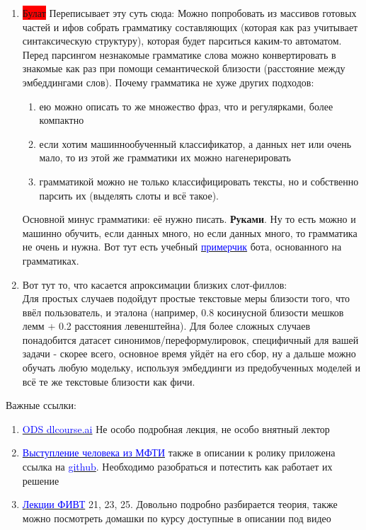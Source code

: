 \documentclass[11pt]{article}
\begin{document}
\begin{enumerate}
\item \colorbox{red}{Булат} Переписывает эту суть сюда:
	Можно попробовать из  массивов готовых частей и ифов собрать грамматику составляющих (которая как раз учитывает синтаксическую структуру), которая будет парситься каким-то автоматом. Перед парсингом незнакомые грамматике слова можно конвертировать в знакомые как раз при помощи семантической близости (расстояние между эмбеддингами слов).
	Почему грамматика не хуже других подходов:
	\begin{enumerate}
	\item ею можно описать то же множество фраз, что и регулярками, более компактно
	\item если хотим машиннообученный классификатор, а данных нет или очень мало, то из этой же грамматики их можно нагенерировать
	\item грамматикой можно не только классифицировать тексты, но и собственно парсить их (выделять слоты и всё такое).
	\end{enumerate}
	Основной минус грамматики: её нужно писать. \textbf{Руками}. Ну то есть можно и машинно обучить, если данных много, но если данных много, то грамматика не очень и нужна.
	Вот тут есть учебный \href{https://github.com/avidale/arxivarius}{\textcolor{blue}{примерчик}} бота, основанного на грамматиках.

\item Вот тут то, что касается апроксимации близких слот-филлов:\\
Для простых случаев подойдут простые текстовые меры близости того, что ввёл пользователь, и эталона (например, 0.8 косинусной близости мешков лемм + 0.2 расстояния левенштейна). Для более сложных случаев понадобится датасет синонимов/переформулировок, специфичный для вашей задачи - скорее всего, основное время уйдёт на его сбор, ну а дальше можно обучать любую модельку, используя эмбеддинги из предобученных моделей и всё те же текстовые близости как фичи.
\end{enumerate}

Важные ссылки:
\begin{enumerate}
\item \href{https://www.youtube.com/watch?v=JpS0LzEWr-4}{\textcolor{blue}{ODS dlcourse.ai}} Не особо подробная лекция, не особо внятный лектор 
\item \href{https://www.youtube.com/watch?v=eke2h9fGtu0}{\textcolor{blue}{Выступление человека из МФТИ}} также в описании к ролику приложена ссылка на \href{https://github.com/nsu-ai-team/voxforge_ru_sphinx_experiments}{\textcolor{blue}{github}}. Необходимо разобраться и потестить как работает их решение
\item \href{https://www.youtube.com/playlist?list=PL0Ks75aof3ThkitsZbUOEQg7Ybl5kB_s3}{\textcolor{blue}{Лекции ФИВТ}} 21, 23, 25. Довольно подробно разбирается теория, также можно посмотреть домашки по курсу доступные в описании под видео

\end{enumerate}
\end{document}
